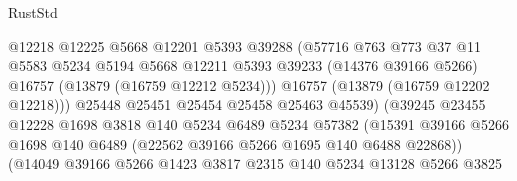 \begin{lexlean}{RustStd}
\begin{coremodule}
                                      @12218
                                      @12225
                                      @5668
                                      @12201
                                      @5393
                                      @39288
                                      (@57716
                                        @763
                                        @773
                                        @37
                                        @11
                                        @5583
                                        @5234
                                        @5194
                                        @5668
                                        @12211
                                        @5393
                                        @39233
                                        (@14376 @39166 @5266)
                                        @16757
                                        (@13879 (@16759 @12212 @5234)))
                                      @16757
                                      (@13879 (@16759 @12202 @12218)))
                                    @25448
                                    @25451
                                    @25454
                                    @25458
                                    @25463
                                    @45539)
                                  (@39245
                                    @23455
                                    @12228
                                    @1698
                                    @3818
                                    @140
                                    @5234
                                    @6489
                                    @5234
                                    @57382
                                    (@15391
                                      @39166
                                      @5266
                                      @1698
                                      @140
                                      @6489
                                      (@22562 @39166 @5266 @1695 @140 @6488 @22868))
                                    (@14049
                                      @39166
                                      @5266
                                      @1423
                                      @3817
                                      @2315
                                      @140
                                      @5234
                                      @13128
                                      @5266
                                      @3825

\end{coremodule}
\end{lexlean}
